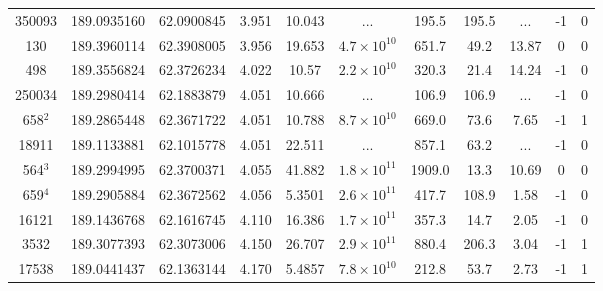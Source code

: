 \begin{table}
\begin{tabular}{ccccccccccc}
     350093 &                  189.0935160 &                 62.0900845 &          3.951 &           10.043 &                ... &          195.5 &       195.5 &         ... &               -1 &                  0 \\
        130 &                  189.3960114 &                 62.3908005 &          3.956 &           19.653 & $4.7\times10^{10}$ &          651.7 &        49.2 &       13.87 &                0 &                  0 \\
        498 &                  189.3556824 &                 62.3726234 &          4.022 &            10.57 & $2.2\times10^{10}$ &          320.3 &        21.4 &       14.24 &               -1 &                  0 \\
     250034 &                  189.2980414 &                 62.1883879 &          4.051 &           10.666 &                ... &          106.9 &       106.9 &         ... &               -1 &                  0 \\
    658$^2$ &                  189.2865448 &                 62.3671722 &          4.051 &           10.788 & $8.7\times10^{10}$ &          669.0 &        73.6 &        7.65 &               -1 &                  1 \\
      18911 &                  189.1133881 &                 62.1015778 &          4.051 &           22.511 &                ... &          857.1 &        63.2 &         ... &               -1 &                  0 \\
    564$^3$ &                  189.2994995 &                 62.3700371 &          4.055 &           41.882 & $1.8\times10^{11}$ &         1909.0 &        13.3 &       10.69 &                0 &                  0 \\
    659$^4$ &                  189.2905884 &                 62.3672562 &          4.056 &           5.3501 & $2.6\times10^{11}$ &          417.7 &       108.9 &        1.58 &               -1 &                  0 \\
      16121 &                  189.1436768 &                 62.1616745 &          4.110 &           16.386 & $1.7\times10^{11}$ &          357.3 &        14.7 &        2.05 &               -1 &                  0 \\
       3532 &                  189.3077393 &                 62.3073006 &          4.150 &           26.707 & $2.9\times10^{11}$ &          880.4 &       206.3 &        3.04 &               -1 &                  1 \\
      17538 &                  189.0441437 &                 62.1363144 &          4.170 &           5.4857 & $7.8\times10^{10}$ &          212.8 &        53.7 &        2.73 &               -1 &                  1 \\

\end{tabular}
\end{table}
